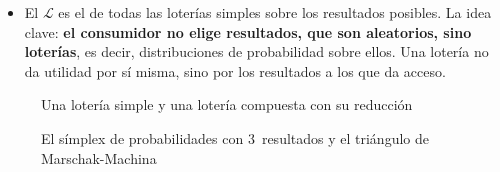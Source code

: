 \documentclass[11pt]{article}
\begin{document}
\begin{itemize}
\begin{itemize}
  \item El  $\mathcal{L}$ es el de todas las loterías simples sobre los resultados posibles. La idea clave: \textbf{el consumidor no elige resultados, que son aleatorios, sino loterías}, es decir, distribuciones de probabilidad sobre ellos. Una lotería no da utilidad por sí misma, sino por los resultados a los que da acceso.
  \end{itemize}
\end{itemize}

\begin{figure}[H]
\centering
\caption{Una lotería simple y una lotería compuesta con su reducción}\label{fig:loteria}
\end{figure}

\begin{figure}[H]
\centering
\caption{El símplex de probabilidades con 3~resultados y el triángulo de Marschak-Machina}\label{fig:simplex}
\end{figure}
\end{document}

